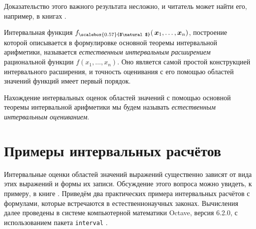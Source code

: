 \documentclass[a5paper,openany]{book}
\newcommand{\mbf}[1]{\protect\text{\boldmath$#1$}}
\newcommand{\NExt}{_{\scalebox{0.57}{$\natural$}}}
\begin{document}
\bigskip 
Доказательство этого важного результата несложно, и читатель может найти его, 
например, в книгах \cite{SSharyBook,MooreBakerCloud}. 
 
Интервальная функция $f\NExt (\,\mbf{x}_{1}, \ldots, \mbf{x}_{n})$, построение 
которой описывается в формулировке основной теоремы интервальной арифметики, 
называется \emph{естественным интервальным расширением} рациональной функции 
$f(x_{1}, \ldots, x_{n})$. Оно является 
самой простой конструкцией интервального расширения, и точность оценивания с его 
помощью областей значений функций имеет первый порядок. 
  
Нахождение интервальных оценок областей значений с помощью основной теоремы интервальной 
арифметики мы будем называть \emph{естественным интервальным оцениванием}. 
  
  
  
\section{Примеры интервальных расчётов} 
  
  
Интервальные оценки областей значений выражений существенно зависят от вида этих 
выражений и формы их записи. Обсуждение этого вопроса можно увидеть, к примеру, 
в книге \cite{SSharyBook}. Приведём два практических примера интервальных расчётов 
с формулами, которые встречаются в естественнонаучных законах. Вычисления далее 
проведены в системе компьютерной математики Octave, версия 6.2.0, с использованием 
пакета \texttt{interval} \cite{OctaveInterval}. 
  
  
\end{document}
